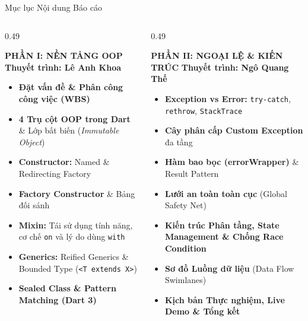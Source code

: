 \documentclass[aspectratio=169, 10pt]{beamer}
\begin{document}
\begin{frame}{Mục lục Nội dung Báo cáo}
  \vspace{-0.1cm}
  \begin{columns}[t,onlytextwidth]
    \begin{column}{0.49\textwidth}
      \begin{block}{\textbf{PHẦN I: NỀN TẢNG OOP}}
        \footnotesize
        \textbf{Thuyết trình: Lê Anh Khoa}
        \begin{itemize}
          \item \textbf{Đặt vấn đề \& Phân công công việc (WBS)}
          \item \textbf{4 Trụ cột OOP trong Dart} \& Lớp bất biến (\textit{Immutable Object})
          \item \textbf{Constructor:} Named \& Redirecting Factory
          \item \textbf{Factory Constructor} \& Bảng đối sánh
          \item \textbf{Mixin:} Tái sử dụng tính năng, cơ chế \texttt{on} và lý do dùng \texttt{with}
          \item \textbf{Generics:} Reified Generics \& Bounded Type (\texttt{<T extends X>})
          \item \textbf{Sealed Class \& Pattern Matching (Dart 3)}
        \end{itemize}
      \end{block}
    \end{column}

    \begin{column}{0.49\textwidth}
      \begin{block}{\textbf{PHẦN II: NGOẠI LỆ \& KIẾN TRÚC}}
        \footnotesize
        \textbf{Thuyết trình: Ngô Quang Thế}
        \begin{itemize}
          \item \textbf{Exception vs Error:} \texttt{try-catch}, \texttt{rethrow}, \texttt{StackTrace}
          \item \textbf{Cây phân cấp Custom Exception} đa tầng
          \item \textbf{Hàm bao bọc (errorWrapper)} \& Result Pattern
          \item \textbf{Lưới an toàn toàn cục} (Global Safety Net)
          \item \textbf{Kiến trúc Phân tầng, State Management \& Chống Race Condition}
          \item \textbf{Sơ đồ Luồng dữ liệu} (Data Flow Swimlanes)
          \item \textbf{Kịch bản Thực nghiệm, Live Demo \& Tổng kết}
        \end{itemize}
      \end{block}
    \end{column}
  \end{columns}
\end{frame}
\end{document}
